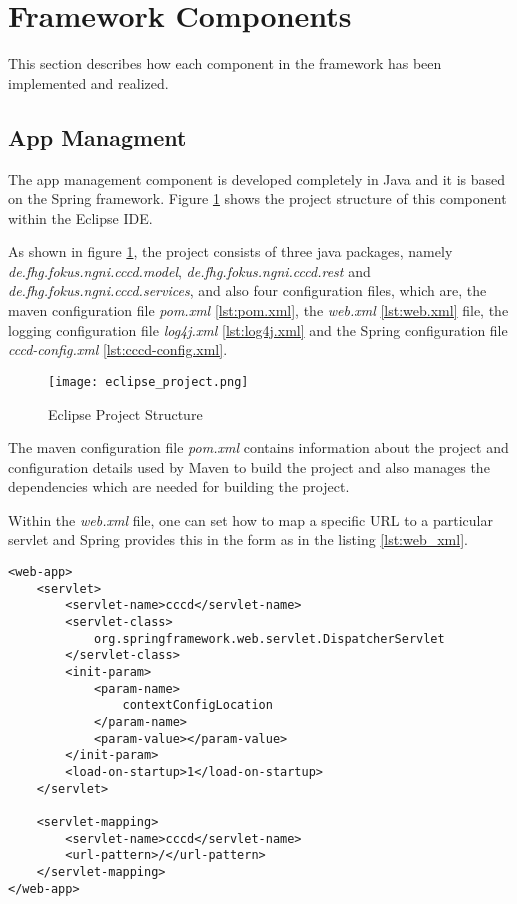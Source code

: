 \section{Framework Components\label{sec:impl_used_op_sr}}
This section describes how each component in the framework has been implemented and realized.

\subsection{App Managment\label{sec:impl_app_man}}
The app management component is developed completely in Java and it is based on the Spring framework. Figure \ref{fig:eclipse_project} shows the project structure of this component within the Eclipse IDE.

As shown in figure \ref{fig:eclipse_project}, the project consists of three java packages, namely \textit{de.fhg.fokus.ngni.cccd.model}, \textit{de.fhg.fokus.ngni.cccd.rest} and \textit{de.fhg.fokus.ngni.cccd.services}, and also four configuration files, which are, the maven configuration file \textit{pom.xml} \ref{lst:pom.xml}, the \textit{web.xml} \ref{lst:web.xml} file, the logging configuration file \textit{log4j.xml} \ref{lst:log4j.xml} and the Spring configuration file \textit{cccd-config.xml} \ref{lst:cccd-config.xml}.

\begin{figure}[htb]
  \centering
  \texttt{[image: eclipse\_project.png]}\\
  \caption{Eclipse Project Structure}
  \label{fig:eclipse_project}
\end{figure}

\pagebreak

The maven configuration file \textit{pom.xml} contains information about the project and configuration details used by Maven to build the project and also manages the dependencies which are needed for building the project.

Within the \textit{web.xml} file, one can set how to map a specific \ac{URL} to a particular servlet and Spring provides this in the form as in the listing \ref{lst:web_xml}.

\begin{code}
\begin{verbatim}
<web-app>
	<servlet>
		<servlet-name>cccd</servlet-name>
		<servlet-class>
			org.springframework.web.servlet.DispatcherServlet
		</servlet-class>
		<init-param>
			<param-name>
				contextConfigLocation
			</param-name>
			<param-value></param-value>
		</init-param>
		<load-on-startup>1</load-on-startup>
	</servlet>

	<servlet-mapping>
		<servlet-name>cccd</servlet-name>
		<url-pattern>/</url-pattern>
	</servlet-mapping>
</web-app>
\end{verbatim}
\caption{Excerpt from the web.xml configuration file}
\label{lst:web_xml}
\end{code}

